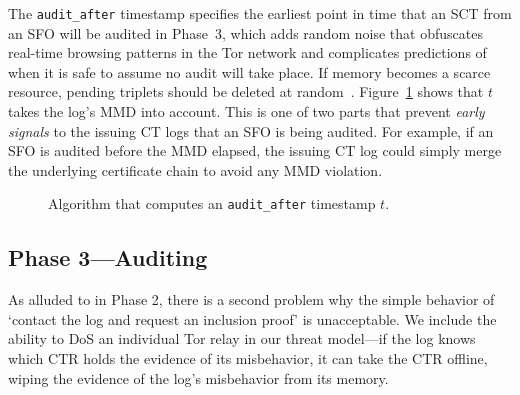 The \texttt{audit\_after} timestamp specifies the earliest point in time that an SCT
from an SFO will be audited in Phase~3, which adds random noise that obfuscates
real-time browsing patterns in the Tor network and complicates predictions of when it is safe to assume no audit will take place.  If memory becomes a scarce
resource, pending triplets should be deleted at random~\cite{nordberg}. Figure~\ref{fig:audit-after}
shows that $t$ takes the log's MMD into account.  This is one of two parts that prevent
\emph{early signals} to the issuing CT logs that an SFO is being audited.  For example,
if an SFO is audited before the MMD elapsed, the issuing CT log could simply merge
the underlying certificate chain to avoid any MMD violation.


\begin{figure}
	\centering
	\caption{%
		Algorithm that computes an \texttt{audit\_after} timestamp $t$.
	}
	\label{fig:audit-after}
\end{figure}

\subsection{Phase 3---Auditing} \label{sec:base:phase3}

As alluded to in Phase 2, there is a second problem why the simple behavior of
`contact the log and request an inclusion proof' is unacceptable. We include
the ability to DoS an individual Tor relay in our threat model---if the log
knows which CTR holds the evidence of its misbehavior, it can take the CTR
offline, wiping the evidence of the log's misbehavior from its memory. 

